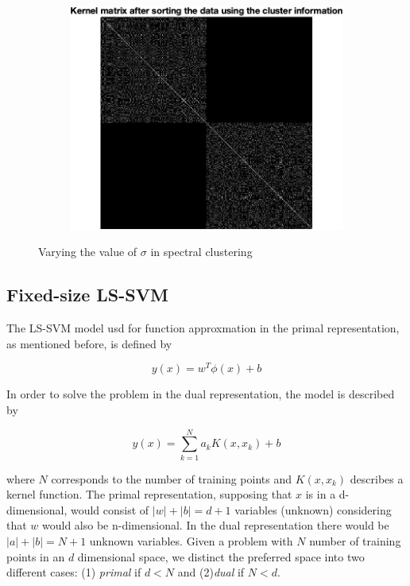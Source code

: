 \documentclass[a4paper, 11pt, one column]{article}
\begin{document}
\begin{figure}[]
\begin{subfigure}{0.33\textwidth}
            \includegraphics[width=\linewidth]{images/9.png}\hfil
        \end{subfigure}
  
        \caption{Varying the value of $\sigma$ in spectral clustering}
        
        \label{fig:varioussigmaspectral}
\end{figure}


\subsection{Fixed-size LS-SVM}
The LS-SVM model usd for function approxmation in the primal representation, as mentioned before, is defined by 

\begin{equation}
    y(x)=w^T\phi(x)+b
\end{equation}

In order to solve the problem in the dual representation, the model is described by 

\begin{equation}
y(x)=\sum_{k=1}^{N}a_kK(x,x_k)+b
\end{equation}

where $N$ corresponds to the number of training points and $K(x,x_k)$ describes a kernel function. The primal representation, supposing that $x$ is in a d-dimensional, would consist of $|w|+|b| = d +1$ variables (unknown) considering that $w$ would also be n-dimensional. In the dual representation there would be $|a|+|b| = N +1$ unknown variables. Given a problem with $N$ number of training points in an $d$ dimensional space, we distinct the preferred space into two different cases: (1) \textit{primal} if \textbf{$d<N$} and (2)\textit{dual} if \textbf{$N<d$}.
\end{document}

